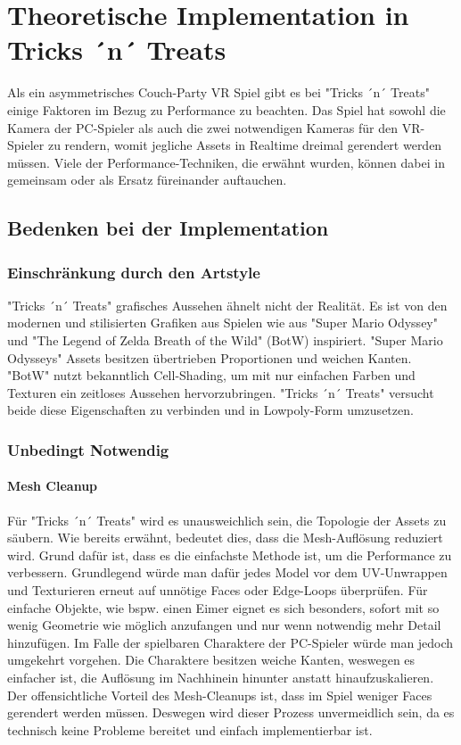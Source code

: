 \chapter{Theoretische Implementation in Tricks ´n´ Treats}

Als ein asymmetrisches Couch-Party VR Spiel gibt es bei "Tricks ´n´ Treats" einige Faktoren im Bezug zu Performance zu beachten. Das Spiel hat sowohl die Kamera der PC-Spieler als auch die zwei notwendigen Kameras für den VR-Spieler zu rendern, womit jegliche Assets in Realtime dreimal gerendert werden müssen. Viele der Performance-Techniken, die erwähnt wurden, können dabei in gemeinsam oder als Ersatz füreinander auftauchen.

\section{Bedenken bei der Implementation}

\subsection{Einschränkung durch den Artstyle}

"Tricks ´n´ Treats" grafisches Aussehen ähnelt nicht der Realität. Es ist von den modernen und stilisierten Grafiken aus Spielen wie aus "Super Mario Odyssey" und "The Legend of Zelda Breath of the Wild" (BotW) inspiriert. "Super Mario Odysseys" Assets besitzen übertrieben Proportionen und weichen Kanten. "BotW" nutzt bekanntlich Cell-Shading, um mit nur einfachen Farben und Texturen ein zeitloses Aussehen hervorzubringen. "Tricks ´n´ Treats" versucht beide diese Eigenschaften zu verbinden und in Lowpoly-Form umzusetzen.

\subsection{Unbedingt Notwendig}

\subsubsection{Mesh Cleanup}

Für "Tricks ´n´ Treats" wird es unausweichlich sein, die Topologie der Assets zu säubern. Wie bereits erwähnt, bedeutet dies, dass die Mesh-Auflösung reduziert wird. Grund dafür ist, dass es die einfachste Methode ist, um die Performance zu verbessern. Grundlegend würde man dafür jedes Model vor dem UV-Unwrappen und Texturieren erneut auf unnötige Faces oder Edge-Loops überprüfen.
Für einfache Objekte, wie bspw. einen Eimer eignet es sich besonders, sofort mit so wenig Geometrie wie möglich anzufangen und nur wenn notwendig mehr Detail hinzufügen. Im Falle der spielbaren Charaktere der PC-Spieler würde man jedoch umgekehrt vorgehen. Die Charaktere besitzen weiche Kanten, weswegen es einfacher ist, die Auflösung im Nachhinein hinunter anstatt hinaufzuskalieren.
Der offensichtliche Vorteil des Mesh-Cleanups ist, dass im Spiel weniger Faces gerendert werden müssen. Deswegen wird dieser Prozess unvermeidlich sein, da es technisch keine Probleme bereitet und einfach implementierbar ist.

